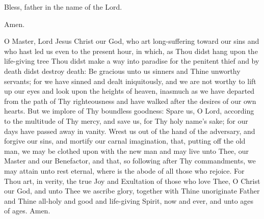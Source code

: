 {%
\begin{reader}
\item \lhmThree
\item \gne
\item 
\item Bless, father in the name of the Lord.
\end{reader}







\vbox{}


\begin{reader}
\item Amen.
\item \lhmTwelve
\end{reader}

\begin{maybetwocolumns}
O Master, Lord Jesus Christ our God, who art long-suffering toward our sins
and who hast led us even to the present hour, in which, as Thou didst hang
upon the life-giving tree Thou didst make a way into paradise for the penitent
thief and by death didst destroy death: Be gracious unto us sinners and Thine
unworthy servants; for we have sinned and dealt iniquitously, and we are not
worthy to lift up our eyes and look upon the heights of heaven, inasmuch as
we have departed from the path of Thy righteousness and have walked after the
desires of our own hearts. But we implore of Thy boundless goodness: Spare
us, O Lord, according to the multitude of Thy mercy, and save us, for Thy holy
name’s sake; for our days have passed away in vanity. Wrest us out of the
hand of the adversary, and forgive our sins, and mortify our carnal
imagination, that, putting off the old man, we may be clothed upon with the
new man and may live unto Thee, our Master and our Benefactor, and that, so
following after Thy commandments, we may attain unto rest eternal, where is
the abode of all those who rejoice. For Thou art, in verity, the true Joy and
Exultation of those who love Thee, O Christ our God, and unto Thee we ascribe
glory, together with Thine unoriginate Father and Thine all-holy and good and
life-giving Spirit, now and ever, and unto ages of ages. Amen.
\end{maybetwocolumns}
}

